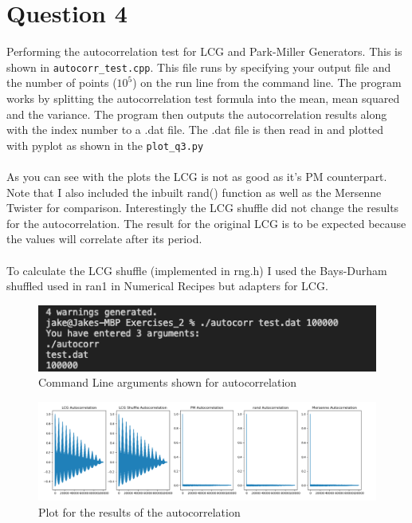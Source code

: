 \documentclass[12pt]{article}
\begin{document}
\section*{Question 4} 
Performing the autocorrelation test for LCG and Park-Miller Generators. This is shown in \lstinline{autocorr_test.cpp}. This file runs by specifying your output file and the number of points ($10^5$) on the run line from the command line. The program works by splitting the autocorrelation test formula into the mean, mean squared and the variance. The program then outputs the autocorrelation results along with the index number to a .dat file. The .dat file is then read in and plotted with pyplot as shown in the \lstinline{plot_q3.py} \\
\\
As you can see with the plots the LCG is not as good as it's PM counterpart. Note that I also included the inbuilt rand() function as well as the Mersenne Twister for comparison. Interestingly the LCG shuffle did not change the results for the autocorrelation. The result for the original LCG is to be expected because the values will correlate after its period. \\
\\
To calculate the LCG shuffle (implemented in rng.h) I used the Bays-Durham shuffled used in ran1 in Numerical Recipes but adapters for LCG. \\



\begin{figure}[h]
    \centering
    \includegraphics[width=15cm]{autocorr_1.png}
    \caption{Command Line arguments shown for autocorrelation}

\end{figure}

\begin{figure}[h]
    \centering
    \includegraphics[width=15cm]{autocorr_2.png}
    \caption{Plot for the results of the autocorrelation}

\end{figure}
\end{document}
